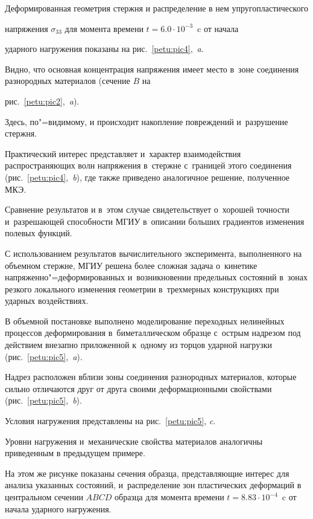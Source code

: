 Деформированная геометрия стержня и распределение в нем упругопластического

напряжения $\sigma _{33}$ для момента времени $t = 6.0\cdot 10^{-3}$~c от начала

ударного нагружения показаны на рис.~\ref{petu:pic4},~{\sl a}. 

Видно, что основная концентрация напряжения имеет место в~зоне соединения разнородных материалов (сечение $B$ на

рис.~\ref{petu:pic2},~{\sl a}). 

Здесь, по"=видимому, и происходит накопление повреждений и~разрушение стержня. 

Практический интерес представляет и~характер взаимодействия распространяющих волн напряжения в~стержне с~границей этого соединения (рис.~\ref{petu:pic4},~{\sl b}), где также приведено аналогичное решение, полученное МКЭ. 

Сравнение результатов и в~этом случае свидетельствует о~хорошей точности и~разрешающей способности МГИУ в~описании больших градиентов изменения полевых функций.



С использованием результатов вычислительного эксперимента, выполненного на объемном стержне, МГИУ решена более сложная задача о~кинетике напряженно"=деформированных и~возникновении предельных состояний в~зонах резкого локального изменения геометрии в~трехмерных конструкциях при ударных воздействиях.





В объемной постановке выполнено моделирование переходных нелинейных процессов деформирования в~биметаллическом образце с~острым надрезом под действием внезапно приложенной к~одному из торцов ударной нагрузки  (рис.~\ref{petu:pic5},~{\sl a}).

Надрез расположен вблизи зоны соединения разнородных материалов, которые сильно отличаются друг от друга своими  деформационными свойствами (рис.~\ref{petu:pic5},~{\sl b}). 

Условия нагружения представлены на рис.~\ref{petu:pic5}, {\sl c}. 

Уровни нагружения и~механические свойства материалов аналогичны приведенным в предыдущем примере. 

На этом же рисунке показаны сечения образца, представляющие интерес для анализа указанных состояний, и~распределение зон пластических деформаций в центральном сечении $ABCD$ образца для момента времени \mbox{$t= 8.83 \cdot 10^{-4}$}~c от начала ударного нагружения. 

